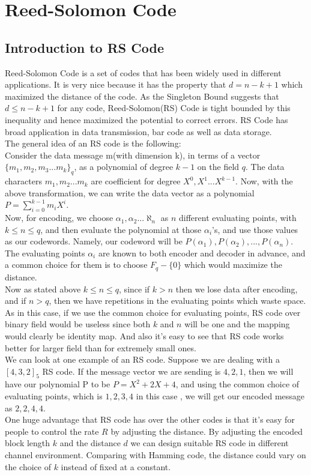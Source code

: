\documentclass{article}
\begin{document}
\section{Reed-Solomon Code}
\subsection{Introduction to RS Code} 
Reed-Solomon Code is a set of codes that has been widely used in different applications. It is very nice because it has the property that $d = n-k+1$ which maximized the distance of the code. As the Singleton Bound suggests that $d \le n-k+1$ for any code, Reed-Solomon(RS) Code is tight bounded by this inequality and hence maximized the potential to correct errors. RS Code has broad application in data transmission, bar code as well as data storage.\\
The general idea of an RS code is the following:\\
Consider the data message m(with dimension k), in terms of a vector\\ $\{m_1, m_2,m_3...m_k\}_q$, as a polynomial of degree $k-1$ on the field $q$. The data characters $m_1, m_2 ...m_k$ are coefficient for degree $X^0, X^1...X^{k-1}$. Now, with the above transformation, we can write the data vector as a polynomial $P = \sum_{i=0}^{k-1}m_iX^i$.\\
Now, for encoding, we choose $\alpha_1, \alpha_2...\aleph_n$ as $n$ different evaluating points, with $k \le n \le q$, and then evaluate the polynomial at those $\alpha_i$'s, and use those values as our codewords. Namely, our codeword will be ${P(\alpha_1), P(\alpha_2) , ... ,P(\alpha_n)}$. The evaluating points $\alpha_i$ are known to both encoder and decoder in advance, and a common choice for them is to choose $F_q - \{0\}$ which would maximize the distance.\\
Now as stated above $k \le n \le q$, since if $k >n$ then we lose data after encoding, and if $n > q$, then we have repetitions in the evaluating points which waste space. As in this case, if we use the common choice for evaluating points, RS code over binary field would be useless since both $k$ and $n$ will be one and the  mapping would clearly be identity map. And also it's easy to see that RS code works better for larger field than for extremely small ones.\\
We can look at one example of an RS code. Suppose we are dealing with a $[4,3,2]_5$ RS code. If the message vector we are sending is ${4, 2, 1}$, then we will have our polynomial P to be $P = X^2 + 2X + 4$, and using the common choice of evaluating points, which is ${1,2,3,4}$ in this case , we will get our encoded message as ${2, 2, 4,4}$.\\
One huge advantage that RS code has over the other codes is that it's easy for people to control the rate $R$ by adjusting the distance. By adjusting the encoded block length $k$ and the distance $d$ we can design suitable RS code in different channel environment. Comparing with Hamming code, the distance could vary on the choice of $k$ instead of fixed at a constant.
\end{document}
